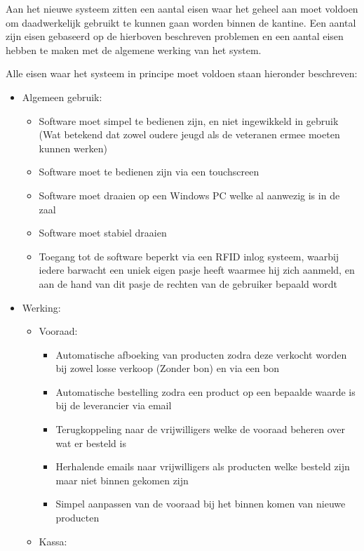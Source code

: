 Aan het nieuwe systeem zitten een aantal eisen waar het geheel aan moet voldoen om daadwerkelijk gebruikt te kunnen gaan worden binnen de kantine. Een aantal zijn eisen gebaseerd op de hierboven beschreven problemen en een aantal eisen hebben te maken met de algemene werking van het system.

Alle eisen waar het systeem in principe moet voldoen staan hieronder beschreven:
\begin{itemize}
        \item Algemeen gebruik: 
        \begin{itemize}
        \item Software moet simpel te bedienen zijn, en niet ingewikkeld in gebruik (Wat betekend dat zowel oudere jeugd als de veteranen ermee moeten kunnen werken)
        \item Software moet te bedienen zijn via een touchscreen
        \item Software moet draaien op een Windows PC welke al aanwezig is in de zaal
        \item Software moet stabiel draaien
        \item Toegang tot de software beperkt via een RFID inlog systeem, waarbij iedere barwacht een uniek eigen pasje heeft waarmee hij zich aanmeld, en aan de hand van dit pasje de rechten van de gebruiker bepaald wordt
        \end{itemize}
        \item Werking:
        \begin{itemize}%
        \item Vooraad:
        \begin{itemize}%
        \item Automatische afboeking van producten zodra deze verkocht worden bij zowel losse verkoop (Zonder bon) en via een bon
        \item Automatische bestelling zodra een product op een bepaalde waarde is bij de leverancier via email
        \item Terugkoppeling naar de vrijwilligers welke de vooraad beheren over wat er besteld is
        \item Herhalende emails naar vrijwilligers als producten welke besteld zijn maar niet binnen gekomen zijn 
        \item Simpel aanpassen van de vooraad bij het binnen komen van nieuwe producten
        \end{itemize}%
        \item Kassa: 

\end{itemize}
\end{itemize}

